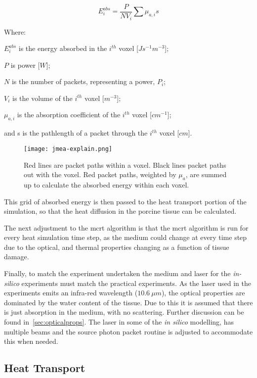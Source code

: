\begin{equation}
E_{i}^{abs} = \frac{P}{N V_i}\sum\mu_{a,i} s
\label{eqn:Eabs}
\end{equation}

\noindent Where:

	\indent $E_i^{abs}$ is the energy absorbed in the $i^{th}$ voxel [$Js^{-1}m^{-3}$];
	
	\indent $P$ is power [$W$];
	
	\indent $N$ is the number of packets, representing a power, $P_i$;
	
	\indent $V_i$ is the volume of the $i^{th}$ voxel [$m^{-3}$];
	
	\indent $\mu_{a,i}$ is the absorption coefficient of the $i^{th}$ voxel [$cm^{-1}$];
	
	\indent and s is the pathlength of a packet through the $i^{th}$ voxel [$cm$].
	
	\medskip
	
\begin{figure}[!htbp]
\centering
\texttt{[image: jmea-explain.png]}
\caption{Red lines are packet paths within a voxel. Black lines packet paths out with the voxel. Red packet paths, weighted by $\mu_a$, are summed up to calculate the absorbed energy within each voxel.}
\label{fig:jmea-explain}
\end{figure}	
		
This grid of absorbed energy is then passed to the heat transport portion of the simulation, so that the heat diffusion in the porcine tissue can be calculated.

The next adjustment to the \gls*{mcrt} algorithm is that the \gls*{mcrt} algorithm is run for every heat simulation time step, as the medium could change at every time step due to the optical, and thermal properties changing as a function of tissue damage.

Finally, to match the experiment undertaken the medium and laser for the \textit{in-silico} experiments must match the practical experiments. As the laser used in the experiments emits an infra-red wavelength ($10.6~\mu m$), the optical properties are dominated by the water content of the tissue. Due to this it is assumed that there is just absorption in the medium, with no scattering. Further discussion can be found in~\cref{sec:opticalprops}. The laser in some of the \textit{in silico} modelling, has multiple beams and the source photon packet routine is adjusted to accommodate this when needed.

\subsection{Heat Transport}

